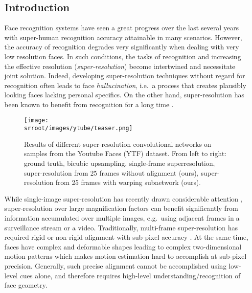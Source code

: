 \subsection{Introduction} Face recognition systems have seen a great progress over the last several years with super-human recognition accuracy attainable in many scenarios. However, the accuracy of recognition degrades very significantly when dealing with very low resolution faces. In such conditions, the tasks of recognition and increasing the effective resolution (\textit{super-resolution}) become intertwined and necessitate joint solution. Indeed, developing  super-resolution techniques without regard for recognition often leads to face \textit{hallucination}, i.e.\ a process that creates plausibly looking faces lacking personal specifics. On the other hand, super-resolution has been known to benefit from recognition for a long time \cite{baker2002limits}.

\begin{figure}[t]
\texttt{[image: \\srroot/images/ytube/teaser.png]}
\caption{Results of different super-resolution convolutional networks on samples from the Youtube Faces (YTF) dataset. From left to right: ground truth, bicubic upsampling,  single-frame superresolution, super-resolution from 25 frames without alignment (ours), super-resolution from 25 frames with warping subnetwork (ours).}
\label{fig:teaser}
\end{figure}



While single-image super-resolution has recently drawn considerable attention \cite{ZhuLLT16, TuzelTH16}, super-resolution over large magnification factors can benefit significantly from information accumulated over multiple images, e.g.\ using adjacent frames in a surveillance stream or a video. Traditionally, multi-frame super-resolution has required rigid or non-rigid alignment with sub-pixel accuracy \cite{capel2003computer}. 
At the same time, faces have complex and deformable shapes leading to complex two-dimensional motion patterns which makes motion estimation hard to accomplish at sub-pixel precision. Generally, such precise alignment cannot be accomplished using low-level cues alone, and therefore requires high-level understanding/recognition of face geometry.



